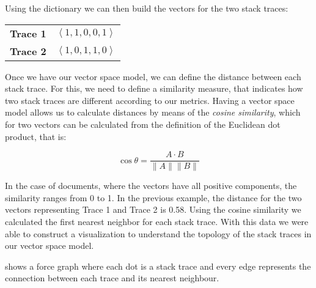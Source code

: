 
Using the dictionary we can then build the vectors for the two stack traces:

\begin{center}
\begin{tabular}{p{2cm}r}
\textbf{Trace 1} & $\left<1,1,0,0,1\right>$ \\
\textbf{Trace 2} & $\left<1,0,1,1,0\right>$
\end{tabular}
\end{center}

Once we have our vector space model, we can define the distance between each stack trace.
For this, we need to define a similarity measure, that indicates how two stack traces are different according to our metrics.
Having a vector space model allows us to calculate distances by means of the \emph{cosine similarity}, which for two vectors can be calculated from the definition of the Euclidean dot product, that is:

\begin{displaymath}
    \cos\theta=\frac{A \cdot B}{\|A\|\|B\|}
\end{displaymath}

In the case of documents, where the vectors have all positive components, the similarity ranges from 0 to 1.
In the previous example, the distance for the two vectors representing Trace 1 and Trace 2 is 0.58.
Using the cosine similarity we calculated the first nearest neighbor for each stack trace.
With this data we were able to construct a visualization to understand the topology of the stack traces in our vector space model.

 shows a force graph where each dot is a stack trace and every edge represents the connection between each trace and its nearest neighbour.

